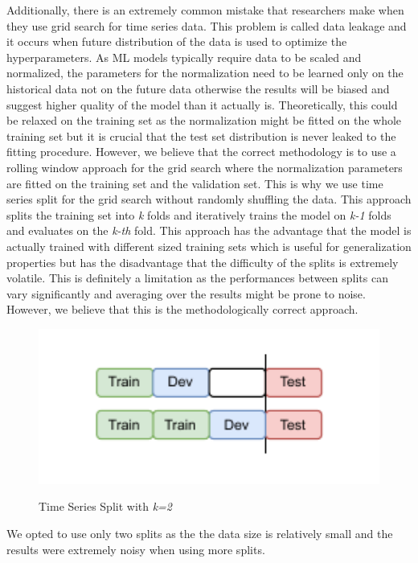 Additionally, there is an extremely
common mistake that researchers make when they use grid search for time series data.
This problem is called data leakage and it occurs when future distribution of the data
is used to optimize the hyperparameters. As \ac{ML} models typically 
require data to be scaled and normalized, the parameters for the normalization 
need to be learned only on the historical data not on the future data otherwise the 
results will be biased and suggest higher quality of the model than it actually is.
Theoretically, this could be relaxed on the training set as the normalization
might be fitted on the whole training set but it is crucial that the test set distribution
is never leaked to the fitting procedure. However, we believe that
the correct methodology is to use a rolling window approach for the grid search
where the normalization parameters are fitted on the training set and the validation set.
This is why we use time series split for the grid search without randomly shuffling the data.
This approach splits the training set into \textit{k} folds and iteratively
trains the model on \textit{k-1} folds and evaluates on the \textit{k-th} fold.
This approach has the advantage that the model is actually trained with
different sized training sets which is useful for generalization properties
but has the disadvantage that the difficulty of the splits is extremely volatile.
This is definitely a limitation as the performances between splits
can vary significantly and averaging over the results might be prone to noise.
However, we believe that this is the methodologically correct approach.
\begin{figure}[!h]
    \centering
    \caption{Time Series Split with \textit{k=2}} 
        \includegraphics[width=1\textwidth]{Figures/time_series_split.drawio.pdf}
    \label{fig:ts_split}
\end{figure}
We opted to use only two splits as the the data size
is relatively small and the results were extremely noisy when using
more splits.


